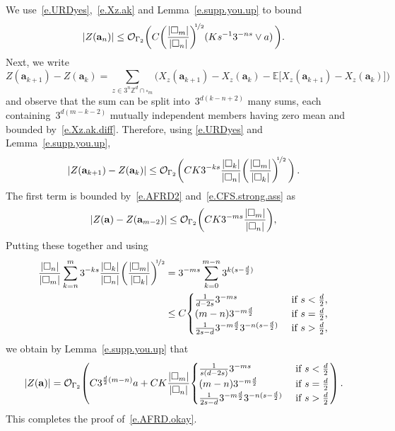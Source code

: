 \documentclass[11pt,twoside]{article} %
\let\oldsquare\square %
\renewcommand{\square}{\oldsquare}
\numberwithin{equation}{section}
\theoremstyle{definition}
\let\originalleft\left
\let\originalright\right
\renewcommand{\left}{\mathopen{}\mathclose\bgroup\originalleft}
\renewcommand{\right}{\aftergroup\egroup\originalright}
\newcommand*{\Zd}{\ensuremath{\mathbb{Z}^d}}
\renewcommand{\a}{\mathbf{a}}
\newcommand{\cu}{\square}
\newcommand{\E}{\mathbb{E}}
\renewcommand{\O}{\mathcal{O}}
\begin{document}
We use~\eqref{e.URDyes},~\eqref{e.Xz.ak} and Lemma~\ref{e.supp.you.up} to bound 
\begin{equation*}
\left| Z({\a}_n) \right| 
\leq 
\O_{\Gamma_2} \biggl( C \biggl( \frac{|\cu_m|}{|\cu_n|} \biggr)^{\!\!\nicefrac12}   ( K s^{-1} 3^{-ns} \vee a)     \, \biggr) .
\end{equation*}
Next, we write 
\begin{equation*}
Z({\a}_{k+1}) - Z({\a}_k)
=
\sum_{z \in 3^n \Zd \cap \cu_m} \bigl( X_{z}(\a_{k+1}) -X_{z}(\a_k) - \E\bigl[ X_{z}(\a_{k+1}) - X_{z}(\a_k) \bigr]  \bigr)
\end{equation*}
and observe that the sum can be split into~$3^{d(k-n+2)}$ many sums, each containing~$3^{d(m-k-2)}$ mutually independent members having zero mean and bounded by~\eqref{e.Xz.ak.diff}. Therefore, using \eqref{e.URDyes} and Lemma~\ref{e.supp.you.up},
\begin{equation*}
\left| Z({\a}_{k+1}) - Z({\a}_k) \right|
\leq 
\O_{\Gamma_2} \biggl( CK3^{-ks}\frac{|\cu_k|}{|\cu_n|}\left( \frac{|\cu_m|}{|\cu_k|} \right)^{\!\!\nicefrac12} \, \biggr) \,.
\end{equation*}
The first term is bounded by~\eqref{e.AFRD2} and~\eqref{e.CFS.strong.ass} as
\begin{equation*}
\left| Z(\a) - Z({\a}_{m-2}) \right| 
\leq 
\O_{\Gamma_2}
\left(CK3^{-ms} \frac{|\cu_m|}{|\cu_n|}\right),
\end{equation*}
Putting these together and using
\begin{align*}  
\frac{|\cu_n|}{|\cu_m|}  \sum_{k=n}^m 3^{-ks}\frac{|\cu_k|}{|\cu_n|}\left( \frac{|\cu_m|}{|\cu_k|} \right)^{\!\!\nicefrac12}
& =
3^{-m s} 
\sum_{k=0}^{m-n}  3^{ k(s - \frac d2) } 
\\ &
\leq
C
\begin{cases}
\frac{1}{d-2s} 3^{-m s}   &   \mbox{ if } s < \frac{d}{2},
\\
(m-n) 3^{-m \frac d2 }   & \mbox{ if } s = \frac{d}{2} ,
\\
\frac{1}{2s-d} 3^{-m \frac d2 } 3^{-n (s - \frac d2)} & \mbox{ if } s > \frac{d}{2} ,
\end{cases}
\end{align*}
 we obtain by Lemma~\ref{e.supp.you.up} that
\begin{equation*}
\left| Z(\a) \right| = \O_{\Gamma_2} \left( 
C 3^{\frac d2 (m-n)} a 
+ 
C K \frac{|\cu_m|}{|\cu_n|}  \begin{cases}
\frac{1}{s(d-2s)} 3^{-m s}   &   \mbox{ if } s < \frac{d}{2}
\\
(m - n) 3^{-m \frac d2 }   & \mbox{ if } s = \frac{d}{2} 
\\
\frac{1}{2s-d} 3^{-m \frac d2 }   3^{-n (s - \frac d2)}  & \mbox{ if } s > \frac{d}{2} 
\end{cases} \right) 
\,.
\end{equation*}
This completes the proof of~\eqref{e.AFRD.okay}. 
\end{document}
